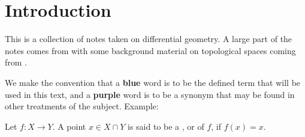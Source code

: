 \chapter*{Introduction}

This is a collection of notes taken on differential geometry. A large part of
the notes comes from \cite{lee2013smooth} with some background material on
topological spaces coming from \cite{munkres2000topology}.

We make the convention that a \textbf{\textcolor{jd_blue}{blue}} word is
to be the defined term that will be used in this text, and a
\textbf{\textcolor{jd_purple}{purple}} word is to be a synonym that may be found
in other treatments of the subject. Example:
\begin{define*}
    Let $f: X \to Y$. A point $x \in X \cap Y$ is said to be a
    , or  of $f$, if
    $f(x) = x$.
\end{define*}